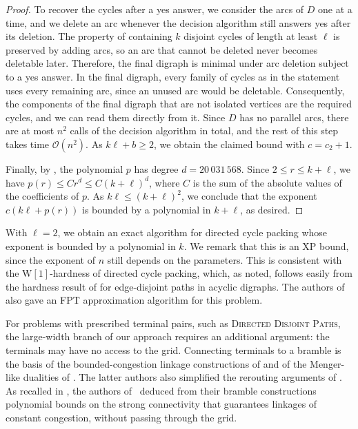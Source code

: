 \documentclass[fontsize=12pt,leading=14pt]{fullpaper}
\newcounter{step}
\begin{document}
\begin{proof}
  To recover the cycles after a yes answer, we consider the arcs of $D$ one at a time, and we delete an arc whenever the decision algorithm still answers yes after its deletion.
  The property of containing $k$ disjoint cycles of length at least $\ell$ is preserved by adding arcs, so an arc that cannot be deleted never becomes deletable later.
  Therefore, the final digraph is minimal under arc deletion subject to a yes answer.
  In the final digraph, every family of cycles as in the statement uses every remaining arc, since an unused arc would be deletable.
  Consequently, the components of the final digraph that are not isolated vertices are the required cycles, and we can read them directly from it.
  Since $D$ has no parallel arcs, there are at most $n^2$ calls of the decision algorithm in total, and the rest of this step takes time $\mathcal{O}(n^2)$.
  As $k\ell+b\ge2$, we obtain the claimed bound with $c=c_2+1$.

  Finally, by , the polynomial $p$ has degree $d=20\,031\,568$.
  Since $2\le r\le k+\ell$, we have $p(r)\le Cr^d\le C(k+\ell)^d$, where $C$ is the sum of the absolute values of the coefficients of $p$.
  As $k\ell\le(k+\ell)^2$, we conclude that the exponent $c(k\ell+p(r))$ is bounded by a polynomial in $k+\ell$, as desired.
\end{proof}

With $\ell=2$, we obtain an exact algorithm for directed cycle packing whose exponent is bounded by a polynomial in $k$.
We remark that this is an XP bound, since the exponent of $n$ still depends on the parameters.
This is consistent with the $\mathrm{W}[1]$-hardness of directed cycle packing, which, as \textcite{GG07} noted, follows easily from the hardness result of \textcite{Slivkins10} for edge-disjoint paths in acyclic digraphs.
The authors of~\cite{GG07} also gave an FPT approximation algorithm for this problem.

For problems with prescribed terminal pairs, such as \textsc{Directed Disjoint Paths}, the large-width branch of our approach requires an additional argument: the terminals may have no access to the grid.
Connecting terminals to a bramble is the basis of the bounded-congestion linkage constructions of \textcite{EMW17} and of the Menger-like dualities of \textcite{CCLS25}.
The latter authors also simplified the rerouting arguments of \textcite{GKKK22}.
As recalled in , the authors of~\cite{LS26,CLNS26} deduced from their bramble constructions polynomial bounds on the strong connectivity that guarantees linkages of constant congestion, without passing through the grid.
\end{document}
